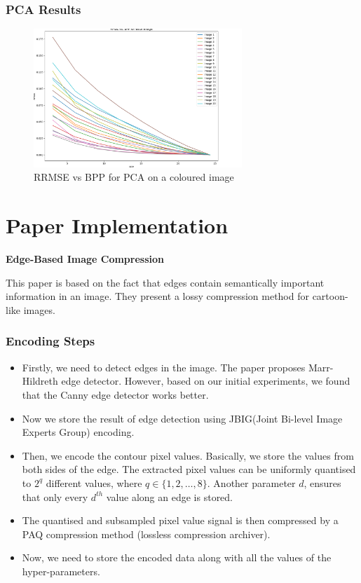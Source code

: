 \documentclass[Serif, 10pt, brown]{beamer}
\theoremstyle{example}
\theoremstyle{plain}
\begin{document}
\begin{frame}
	\frametitle{PCA Results}
	\begin{figure}
		\centering
		\includegraphics[width=0.7\textwidth]{../results/cpca.png}
		\caption{RRMSE vs BPP for PCA on a coloured image}
	\end{figure}
\end{frame}



\section{Paper Implementation}
\begin{frame}
    \centering
    {\Huge \textbf{Edge-Based Image Compression}}

	\vspace{1cm}
	This paper is based on the fact that edges contain semantically important information in an image. They present a lossy compression method for cartoon-like images.
\end{frame}

\begin{frame}
	\frametitle{Encoding Steps}
	\begin{itemize}
		\item Firstly, we need to detect edges in the image. The paper proposes Marr-Hildreth edge detector. However, based on our initial experiments, we found that the Canny edge detector works better.
		\item Now we store the result of edge detection using JBIG(Joint Bi-level Image Experts Group) encoding.
		\item Then, we encode the contour pixel values. Basically, we store the
		values from both sides of the edge. The extracted pixel values can be uniformly quantised to $2^q$ diﬀerent values,
		where $q \in \{1, 2, \dots, 8\}$. Another parameter $d$, ensures that only every $d^{th}$ value along an edge is stored.
		\item The quantised and subsampled pixel value signal is then compressed by a PAQ compression method (lossless compression archiver).
		\item Now, we need to store the encoded data along with all the values of the hyper-parameters.
	\end{itemize}
\end{frame}
\end{document}
